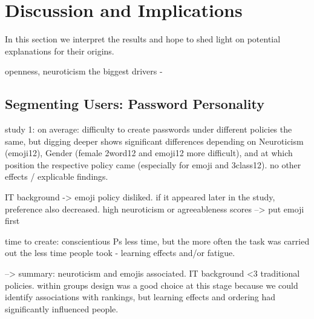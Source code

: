 






\section{Discussion and Implications}
In this section we interpret the results and hope to shed light on potential explanations for their origins. %


openness, neuroticism the biggest drivers - 
\subsection{Segmenting Users: Password Personality}
study 1:
on average: difficulty to create passwords under different policies the same, but digging deeper shows significant differences depending on Neuroticism (emoji12), Gender (female 2word12 and emoji12 more difficult), and at which position the respective policy came (especially for emoji and 3class12). no other effects / explicable findings.

IT background -> emoji policy disliked. if it appeared later in the study, preference also decreased. high neuroticism or agreeableness scores --> put emoji first

time to create: conscientious Ps less time, but the more often the task was carried out the less time people took - learning effects and/or fatigue. 

--> summary: neuroticism and emojis associated. IT background <3 traditional policies. within groups design was a good choice at this stage because we could identify associations with rankings, but learning effects and ordering had significantly influenced people. 

